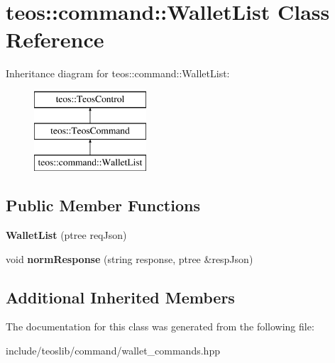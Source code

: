 \hypertarget{classteos_1_1command_1_1_wallet_list}{}\section{teos\+:\+:command\+:\+:Wallet\+List Class Reference}
\label{classteos_1_1command_1_1_wallet_list}
Inheritance diagram for teos\+:\+:command\+:\+:Wallet\+List\+:\begin{figure}[H]
\begin{center}
\leavevmode
\includegraphics[height=3.000000cm]{classteos_1_1command_1_1_wallet_list}
\end{center}
\end{figure}
\subsection*{Public Member Functions}
\begin{DoxyCompactItemize}
\item 
\mbox{\label{classteos_1_1command_1_1_wallet_list_a90c0173a82e45a1f1e1841b69a85a67c}} 
{\bfseries Wallet\+List} (ptree req\+Json)
\item 
\mbox{\label{classteos_1_1command_1_1_wallet_list_adb087e1fa5dc45ddcd7315709db44863}} 
void {\bfseries norm\+Response} (string response, ptree \&resp\+Json)
\end{DoxyCompactItemize}
\subsection*{Additional Inherited Members}


The documentation for this class was generated from the following file\+:\begin{DoxyCompactItemize}
\item 
include/teoslib/command/wallet\+\_\+commands.\+hpp\end{DoxyCompactItemize}
